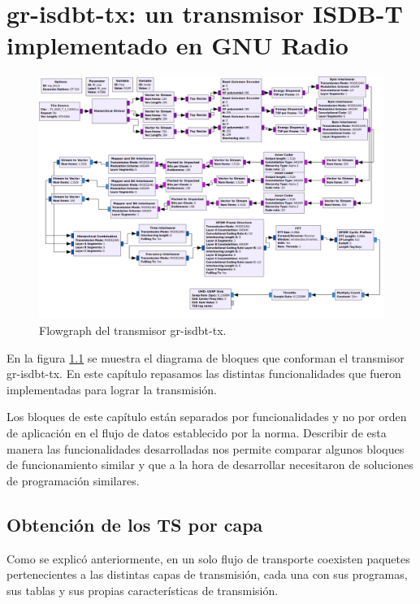 \chapter{gr-isdbt-tx: un transmisor ISDB-T implementado en GNU Radio}

\begin{figure}[h!]
	\centering
	\includegraphics[scale=0.3]{figuras/cap05/flowgraphEdited}
	\caption{\label{f:flowgraphEdited} Flowgraph del transmisor gr-isdbt-tx.}
\end{figure}

En la figura \ref{f:flowgraphEdited} se muestra el diagrama de bloques que conforman el transmisor gr-isdbt-tx. En este capítulo repasamos las distintas funcionalidades que fueron implementadas para lograr la transmisión.

Los bloques de este capítulo están separados por funcionalidades y no por orden de aplicación en el flujo de datos establecido por la norma. Describir de esta manera las funcionalidades desarrolladas nos permite comparar algunos bloques de funcionamiento similar y que a la hora de desarrollar necesitaron de soluciones de programación similares.

\section{Obtención de los TS por capa}

Como se explicó anteriormente, en un solo flujo de transporte coexisten paquetes pertenecientes a las distintas capas de transmisión, cada una con sus programas, sus tablas y sus propias características de transmisión.

